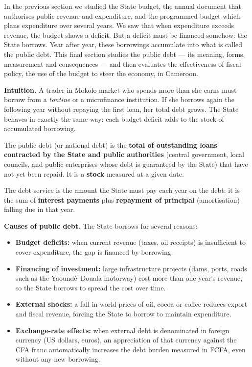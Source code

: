 \documentclass[11pt]{article}
\newcommand{\cle}[1]{{\popxbold\color{popdark}#1}}
\newcounter{popsec}
\newcounter{popsub}
\newcommand{\courssub}[1]{%
  \stepcounter{popsub}%
  \par\vspace{9pt}\noindent{\popxbold\fontsize{11.5}{13}\selectfont\color{popink}{\color{poporange}\thepopsec.\thepopsub}\hspace{6pt}#1}\par\nopagebreak\vspace{4pt}
}
\begin{document}
In the previous section we studied the State budget, the annual document that authorises public revenue and expenditure, and the programmed budget which plans expenditure over several years. We saw that when expenditure exceeds revenue, the budget shows a \cle{deficit}. But a deficit must be financed somehow: the State borrows. Year after year, these borrowings accumulate into what is called the \cle{public debt}. This final section studies the public debt --- its meaning, forms, measurement and consequences --- and then evaluates the effectiveness of \cle{fiscal policy}, the use of the budget to steer the economy, in Cameroon.

\courssub{Meaning and Causes of the Public Debt}

\textbf{Intuition.} A trader in Mokolo market who spends more than she earns must borrow from a \emph{tontine} or a microfinance institution. If she borrows again the following year without repaying the first loan, her total debt grows. The State behaves in exactly the same way: each budget deficit adds to the stock of accumulated borrowing.

\begin{definition}
The \cle{public debt} (or \cle{national debt}) is the \textbf{total of outstanding loans contracted by the State and public authorities} (central government, local councils, and public enterprises whose debt is guaranteed by the State) that have not yet been repaid. It is a \textbf{stock} measured at a given date.

The \cle{debt service} is the amount the State must pay each year on the debt: it is the sum of \textbf{interest payments} plus \textbf{repayment of principal} (amortisation) falling due in that year.
\end{definition}

\textbf{Causes of public debt.} The State borrows for several reasons:
\begin{itemize}
\item \textbf{Budget deficits:} when current revenue (taxes, oil receipts) is insufficient to cover expenditure, the gap is financed by borrowing.
\item \textbf{Financing of investment:} large infrastructure projects (dams, ports, roads such as the Yaound\'e--Douala motorway) cost more than one year's revenue, so the State borrows to spread the cost over time.
\item \textbf{External shocks:} a fall in world prices of oil, cocoa or coffee reduces export and fiscal revenue, forcing the State to borrow to maintain expenditure.
\item \textbf{Exchange-rate effects:} when external debt is denominated in foreign currency (US dollars, euros), an appreciation of that currency against the CFA franc automatically increases the debt burden measured in FCFA, even without any new borrowing.
\end{itemize}
\end{document}
